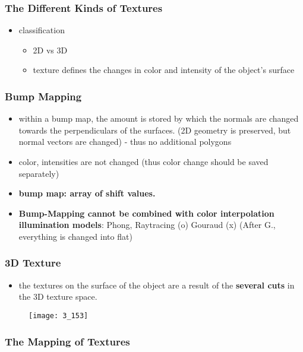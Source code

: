 \documentclass{standalone}
\begin{document}
\subsubsection{The Different Kinds of Textures}

\begin{itemize}
	\item classification 
		\begin{itemize}
			\item 2D vs 3D
			\item texture defines the changes in color and intensity of the object's surface
		\end{itemize}
\end{itemize}

\subsubsection*{Bump Mapping}

\begin{itemize}
	\item within a bump map, the amount is stored by which the normals are changed towards the perpendiculars of the surfaces. (2D geometry is preserved, but normal vectors are changed) - thus no additional polygons
	\item color, intensities are not changed (thus color change should be saved separately)
	\item \textbf{bump map: array of shift values.} 
	\item \textbf{Bump-Mapping cannot be combined with color interpolation illumination models}: Phong, Raytracing (o) Gouraud (x) (After G., everything is changed into flat)
\end{itemize}

\subsubsection*{3D Texture}

\begin{itemize}
	\item the textures on the surface of the object are a result of the \textbf{several cuts} in the 3D texture space.
\end{itemize}

\begin{figure}
	\texttt{[image: 3\_153]}
\end{figure}

\subsubsection{The Mapping of Textures}
\end{document}
